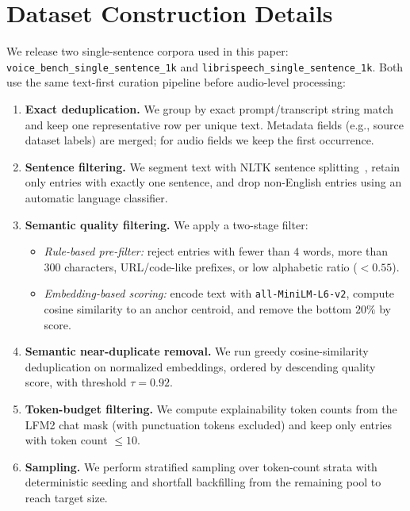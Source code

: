 \documentclass[cameraready]{Interspeech}
\begin{document}
\section{Dataset Construction Details}
\label{app:dataset_creation}

We release two single-sentence corpora used in this paper: \texttt{voice\_bench\_single\_sentence\_1k} and \texttt{librispeech\_single\_sentence\_1k}. Both use the same text-first curation pipeline before audio-level processing:
\begin{enumerate}
  \item \textbf{Exact deduplication.} We group by exact prompt/transcript string match and keep one representative row per unique text. Metadata fields (e.g., source dataset labels) are merged; for audio fields we keep the first occurrence.
  \item \textbf{Sentence filtering.} We segment text with NLTK sentence splitting~\cite{bird2009natural}, retain only entries with exactly one sentence, and drop non-English entries using an automatic language classifier.
  \item \textbf{Semantic quality filtering.} We apply a two-stage filter:
  \begin{itemize}
    \item \emph{Rule-based pre-filter:} reject entries with fewer than $4$ words, more than $300$ characters, URL/code-like prefixes, or low alphabetic ratio ($<0.55$).
    \item \emph{Embedding-based scoring:} encode text with \texttt{all-MiniLM-L6-v2}, compute cosine similarity to an anchor centroid, and remove the bottom $20\%$ by score.
  \end{itemize}
  \item \textbf{Semantic near-duplicate removal.} We run greedy cosine-similarity deduplication on normalized embeddings, ordered by descending quality score, with threshold $\tau=0.92$.
  \item \textbf{Token-budget filtering.} We compute explainability token counts from the LFM2 chat mask (with punctuation tokens excluded) and keep only entries with token count $\leq 10$.
  \item \textbf{Sampling.} We perform stratified sampling over token-count strata with deterministic seeding and shortfall backfilling from the remaining pool to reach target size.
\end{enumerate}
\end{document}
